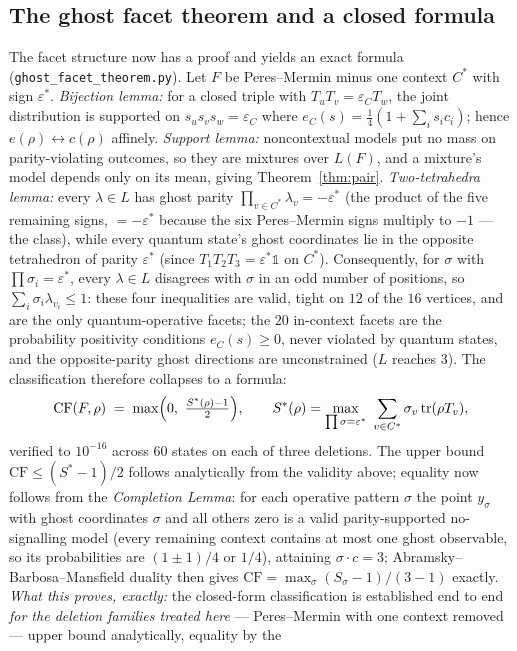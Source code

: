 \documentclass[11pt]{article}
\theoremstyle{remark}
\theoremstyle{plain}
\begin{document}
\subsection*{The ghost facet theorem and a closed formula}
The facet structure now has a proof and yields an exact formula
(\texttt{ghost\_facet\_theorem.py}). Let $F$ be Peres--Mermin minus one context $C^*$
with sign $\varepsilon^*$. \emph{Bijection lemma:} for a closed triple with
$T_uT_v=\varepsilon_C T_w$, the joint distribution is supported on
$s_us_vs_w=\varepsilon_C$ where $e_C(s)=\tfrac14(1+\sum_i s_i c_i)$; hence
$e(\rho)\leftrightarrow c(\rho)$ affinely. \emph{Support lemma:} noncontextual models
put no mass on parity-violating outcomes, so they are mixtures over $L(F)$, and a
mixture's model depends only on its mean, giving Theorem~\ref{thm:pair}.
\emph{Two-tetrahedra lemma:} every $\lambda\in L$ has ghost parity
$\prod_{v\in C^*}\lambda_v=-\varepsilon^*$ (the product of the five remaining signs,
$=-\varepsilon^*$ because the six Peres--Mermin signs multiply to $-1$ --- the class),
while every quantum state's ghost coordinates lie in the opposite tetrahedron of parity
$\varepsilon^*$ (since $T_1T_2T_3=\varepsilon^*\mathbb 1$ on $C^*$). Consequently, for
$\sigma$ with $\prod\sigma_i=\varepsilon^*$, every $\lambda\in L$ disagrees with
$\sigma$ in an odd number of positions, so $\sum_i\sigma_i\lambda_{v_i}\le 1$: these
four inequalities are valid, tight on $12$ of the $16$ vertices, and are the only
quantum-operative facets; the $20$ in-context facets are the probability positivity
conditions $e_C(s)\ge 0$, never violated by quantum states, and the opposite-parity
ghost directions are unconstrained ($L$ reaches $3$). The classification therefore
collapses to a formula:
\[ \mathrm{CF}(F,\rho)\;=\;\max\Bigl(0,\ \tfrac{S^*(\rho)-1}{2}\Bigr),\qquad
   S^*(\rho)=\max_{\prod\sigma=\varepsilon^*}\ \sum_{v\in C^*}\sigma_v\,
   \mathrm{tr}(\rho T_v), \]
verified to $10^{-16}$ across $60$ states on each of three deletions. The upper bound
$\mathrm{CF}\le(S^*-1)/2$ follows analytically from the validity above; equality now
follows from the \emph{Completion Lemma}: for each operative pattern $\sigma$ the point
$y_\sigma$ with ghost coordinates $\sigma$ and all others zero is a valid
parity-supported no-signalling model (every remaining context contains at most one ghost
observable, so its probabilities are $(1\pm1)/4$ or $1/4$), attaining $\sigma\cdot c=3$;
Abramsky--Barbosa--Mansfield duality then gives
$\mathrm{CF}=\max_\sigma(S_\sigma-1)/(3-1)$ exactly. \emph{What this proves, exactly:} the
closed-form classification is established end to end \emph{for the deletion families treated
here} --- Peres--Mermin with one context removed --- upper bound analytically, equality by the
\end{document}
